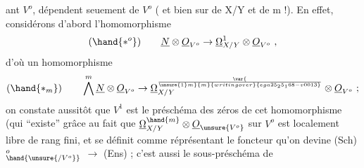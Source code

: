 ant $V^o$,   dépendent seuement de  $V^o$ ( et bien sur de X/Y et de
m !).  En effet, considérons d'abord  l'homomorphisme
\[ (\hand{*^o}) \qquad \underline{N}\otimes\underline{O}_{V^o}\to\underline{\Omega}^1_{X/Y}\otimes\underline{O}_{V^o} \ , \]
d'où  un homomorphisme
\[ (\hand{*_m}) \qquad \bigwedge^m\underline{N}\otimes\underline{O}_{V^o}\to\underline{\Omega}^{\var{\over{\unsure{1}}{m}}{m}{writing over}{ega25_25_168-v0013}}_{X/Y}\otimes\underline{O}_{V^o}\ ; \]
on constate aussitôt que $V^1$ est le préschéma des zéros de cet homomorphisme
(qui ``existe'' grâce au fait que $\underline{\Omega}^{\hand{m}}_{X/Y}\otimes\underline{O}_{\unsure{V^o}}$  sur  $V^o$ est localement libre
de rang fini, et se définit comme réprésentant le foncteur qu'on devine
(Sch)$^o_{\hand{\unsure{/V^o}}}$ $\longrightarrow$ (Ens) ; c'est aussi le sous-préschéma de 

